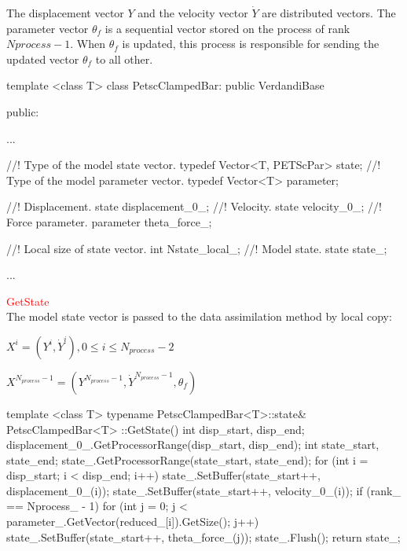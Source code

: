 \documentclass{tufte-book}
\begin{document}
The displacement vector $Y$ and the velocity vector $\dot Y$ are distributed vectors. The parameter vector $\theta_f$ is a sequential vector stored on the process of rank $Nprocess - 1$. When $\theta_f$ is updated, this process is responsible for sending the updated vector $\theta_f$ to all other.


\begin{frame_cpp}
template <class T>
class PetscClampedBar: public VerdandiBase
{
    public:

        ...

        //! Type of the model state vector.
        typedef Vector<T, PETScPar> state;
        //! Type of the model parameter vector.
        typedef Vector<T> parameter;


        //! Displacement.
        state displacement_0_;
        //! Velocity.
        state velocity_0_;
        //! Force parameter.
        parameter theta_force_;

         //! Local size of state vector.
        int Nstate_local_;
        //! Model state.
        state state_;

        ...

}
  \end{frame_cpp}



\par \textcolor{red}{GetState}\\


The model state vector is passed to the data assimilation method by local copy:


$X^i = (Y^i, \dot Y^i), 0 \le i \le N_{process} - 2 $ \par
$X^{N_{process} - 1} = (Y^{N_{process} - 1}, \dot Y^{N_{process} - 1}, \theta_f)$


 \begin{frame_cpp}
template <class T>
typename PetscClampedBar<T>::state& PetscClampedBar<T>
::GetState()
{
    int disp_start, disp_end;
    displacement_0_.GetProcessorRange(disp_start, disp_end);
    int state_start, state_end;
    state_.GetProcessorRange(state_start, state_end);
    for (int i = disp_start; i < disp_end; i++)
    {
        state_.SetBuffer(state_start++, displacement_0_(i));
        state_.SetBuffer(state_start++, velocity_0_(i));
    }
    if (rank_ == Nprocess_ - 1)
        for (int j = 0; j < parameter_.GetVector(reduced_[i]).GetSize(); j++)
            state_.SetBuffer(state_start++, theta_force_(j));
    state_.Flush();
    return state_;
}
  \end{frame_cpp}
\end{document}
